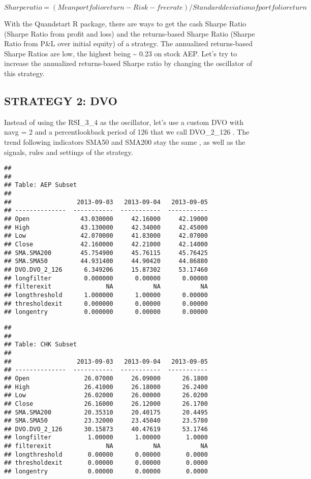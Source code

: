 \documentclass[12pt,]{article}
\begin{document}
\[ Sharpe ratio = (Mean portfolio return - Risk-free rate ) / Standard deviation of portfolio return \]

With the Quandstart R package, there are ways to get the cash Sharpe
Ratio (Sharpe Ratio from profit and loss) and the returns-based Sharpe
Ratio (Sharpe Ratio from P\&L over initial equity) of a strategy. The
annualized returns-based Sharpe Ratios are low, the highest being
\textasciitilde{} 0.23 on stock AEP. Let's try to increase the
annualized returns-based Sharpe ratio by changing the oscillator of this
strategy.

\subsection{STRATEGY 2: DVO}\label{strategy-2-dvo}

Instead of using the RSI\_3\_4 as the oscillator, let's use a custom DVO
with navg = 2 and a percentlookback period of 126 that we call
DVO\_2\_126 . The trend following indicators SMA50 and SMA200 stay the
same , as well as the signals, rules and settings of the strategy.

\begin{verbatim}
## 
## 
## Table: AEP Subset
## 
##                  2013-09-03   2013-09-04   2013-09-05
## --------------  -----------  -----------  -----------
## Open              43.030000     42.16000     42.19000
## High              43.130000     42.34000     42.45000
## Low               42.070000     41.83000     42.07000
## Close             42.160000     42.21000     42.14000
## SMA.SMA200        45.754900     45.76115     45.76425
## SMA.SMA50         44.931400     44.90420     44.86880
## DVO.DVO_2_126      6.349206     15.87302     53.17460
## longfilter         0.000000      0.00000      0.00000
## filterexit               NA           NA           NA
## longthreshold      1.000000      1.00000      0.00000
## thresholdexit      0.000000      0.00000      0.00000
## longentry          0.000000      0.00000      0.00000
\end{verbatim}

\begin{verbatim}
## 
## 
## Table: CHK Subset
## 
##                  2013-09-03   2013-09-04   2013-09-05
## --------------  -----------  -----------  -----------
## Open               26.07000     26.09000      26.1800
## High               26.41000     26.18000      26.2400
## Low                26.02000     26.00000      26.0200
## Close              26.16000     26.12000      26.1700
## SMA.SMA200         20.35310     20.40175      20.4495
## SMA.SMA50          23.32000     23.45040      23.5780
## DVO.DVO_2_126      30.15873     40.47619      53.1746
## longfilter          1.00000      1.00000       1.0000
## filterexit               NA           NA           NA
## longthreshold       0.00000      0.00000       0.0000
## thresholdexit       0.00000      0.00000       0.0000
## longentry           0.00000      0.00000       0.0000
\end{verbatim}
\end{document}

